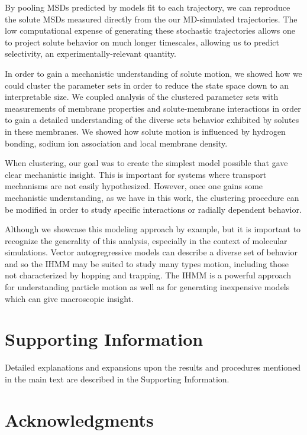 \documentclass[journal=jpcbfk,manuscript=article]{achemso}
\begin{document}
  By pooling MSDs predicted by models fit to each trajectory, we can reproduce
  the solute MSDs measured directly from the our MD-simulated trajectories. 
  The low computational expense of generating these stochastic trajectories allows
  one to project solute behavior on much longer timescales, allowing us to predict
  selectivity, an experimentally-relevant quantity.
  
  In order to gain a mechanistic understanding of solute motion, we showed how 
  we could cluster the parameter sets in order to reduce the state space down
  to an interpretable size. We coupled analysis of the clustered parameter sets
  with measurements of membrane properties and solute-membrane interactions 
  in order to gain a detailed understanding of the diverse sets behavior 
  exhibited by solutes in these membranes. We showed how
  solute motion is influenced by hydrogen bonding, sodium ion association and local
  membrane density.
  
  When clustering, our goal was to create the simplest model possible that gave
  clear mechanistic insight. This is important for systems where transport mechanisms
  are not easily hypothesized. However, once one gains some mechanistic understanding,
  as we have in this work, the clustering procedure can be modified in order to 
  study specific interactions or radially dependent behavior.
  
  Although we showcase this modeling approach by example, but it is important to
  recognize the generality of this analysis, especially in the context of molecular
  simulations. Vector autogregressive models can describe a diverse set of behavior
  and so the IHMM may be suited to study many types motion, including those not 
  characterized by hopping and trapping. The IHMM is a powerful approach for 
  understanding particle motion as well as for generating inexpensive models
  which can give macroscopic insight.
  
  \section*{Supporting Information}

  Detailed explanations and expansions upon the results and procedures mentioned in
  the main text are described in the Supporting Information. 

  \section*{Acknowledgments}
\end{document}
